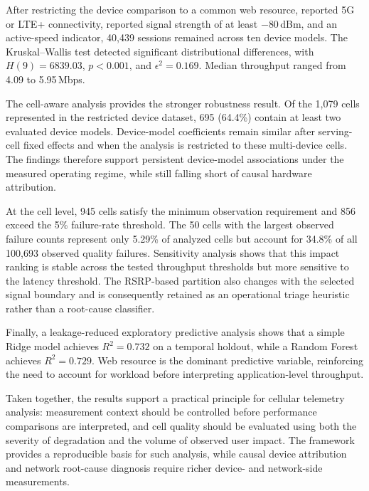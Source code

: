 \documentclass[conference]{IEEEtran}
\begin{document}
After restricting the device comparison to a common web resource, reported 5G or LTE+ connectivity, reported signal strength of at least $-80$\,dBm, and an active-speed indicator, 40,439 sessions remained across ten device models. The Kruskal--Wallis test detected significant distributional differences, with $H(9)=6839.03$, $p<0.001$, and $\epsilon^2=0.169$. Median throughput ranged from 4.09 to 5.95\,Mbps.

The cell-aware analysis provides the stronger robustness result. Of the 1,079 cells represented in the restricted device dataset, 695 (64.4\%) contain at least two evaluated device models. Device-model coefficients remain similar after serving-cell fixed effects and when the analysis is restricted to these multi-device cells. The findings therefore support persistent device-model associations under the measured operating regime, while still falling short of causal hardware attribution.

At the cell level, 945 cells satisfy the minimum observation requirement and 856 exceed the 5\% failure-rate threshold. The 50 cells with the largest observed failure counts represent only 5.29\% of analyzed cells but account for 34.8\% of all 100,693 observed quality failures. Sensitivity analysis shows that this impact ranking is stable across the tested throughput thresholds but more sensitive to the latency threshold. The RSRP-based partition also changes with the selected signal boundary and is consequently retained as an operational triage heuristic rather than a root-cause classifier.

Finally, a leakage-reduced exploratory predictive analysis shows that a simple Ridge model achieves $R^2=0.732$ on a temporal holdout, while a Random Forest achieves $R^2=0.729$. Web resource is the dominant predictive variable, reinforcing the need to account for workload before interpreting application-level throughput.

Taken together, the results support a practical principle for cellular telemetry analysis: measurement context should be controlled before performance comparisons are interpreted, and cell quality should be evaluated using both the severity of degradation and the volume of observed user impact. The framework provides a reproducible basis for such analysis, while causal device attribution and network root-cause diagnosis require richer device- and network-side measurements.

\balance



\end{document}
